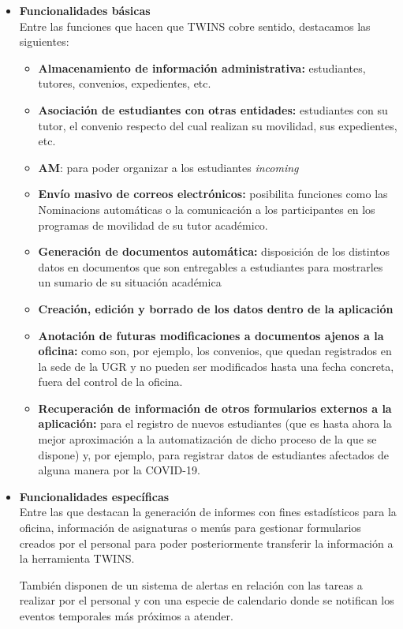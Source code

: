 \begin{itemize}
	\item \textbf{Funcionalidades básicas}\\
	Entre las funciones que hacen que TWINS cobre sentido, destacamos las siguientes:
	
	\begin{itemize}
		\item \textbf{Almacenamiento de información administrativa:} estudiantes, tutores, convenios, expedientes, etc.
		\item \textbf{Asociación de estudiantes con otras entidades:} estudiantes con su tutor, el convenio respecto del cual realizan su movilidad, sus expedientes, etc.
		\item \textbf{\gls{AM}}: para poder organizar a los estudiantes \textit{incoming}
		\item \textbf{Envío masivo de correos electrónicos:} posibilita funciones como las \glspl{Nominacion} automáticas o la comunicación a los participantes en los programas de movilidad de su tutor académico.
		\item \textbf{Generación de documentos automática:} disposición de los distintos datos en documentos que son entregables a estudiantes para mostrarles un sumario de su situación académica
		\item \textbf{Creación, edición y borrado de los datos dentro de la aplicación}
		\item \textbf{Anotación de futuras modificaciones a documentos ajenos a la oficina:} como son, por ejemplo, los convenios, que quedan registrados en la sede de la UGR y no pueden ser modificados hasta una fecha concreta, fuera del control de la oficina.
		\item \textbf{Recuperación de información de otros formularios externos a la aplicación:} para el registro de nuevos estudiantes (que es hasta ahora la mejor aproximación a la automatización de dicho proceso de la que se dispone) y, por ejemplo, para registrar datos de estudiantes afectados de alguna manera por la COVID-19.
	\end{itemize}

	\item \textbf{Funcionalidades específicas}\\
	Entre las que destacan la generación de informes con fines estadísticos para la oficina, información de asignaturas o menús para gestionar formularios creados por el personal para poder posteriormente transferir la información a la herramienta TWINS.
	
	También disponen de un sistema de alertas en relación con las tareas a realizar por el personal y con una especie de calendario donde se notifican los eventos temporales más próximos a atender.
\end{itemize}

